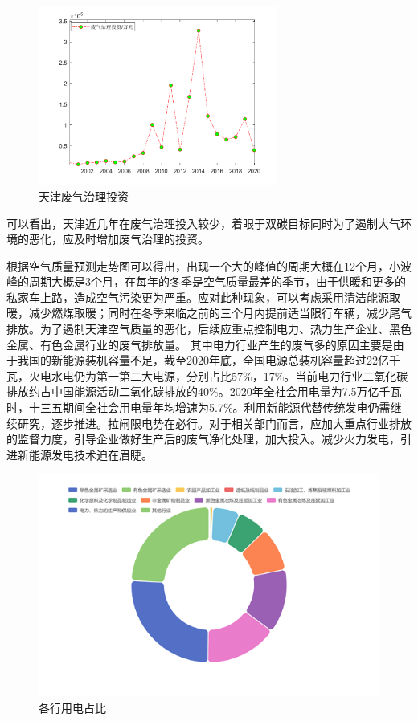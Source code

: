 \documentclass[UTF8]{ctexart}
\begin{document}
\begin{figure}[H] %
    \centering %
    \includegraphics[width=0.7\textwidth]{./picture/touzi.png} %
    \caption{天津废气治理投资} 
\end{figure}

可以看出，天津近几年在废气治理投入较少，着眼于双碳目标同时为了遏制大气环境的恶化，应及时增加废气治理的投资。

根据空气质量预测走势图可以得出，出现一个大的峰值的周期大概在12个月，小波峰的周期大概是3个月，在每年的冬季是空气质量最差的季节，由于供暖和更多的私家车上路，造成空气污染更为严重。应对此种现象，可以考虑采用清洁能源取暖，减少燃煤取暖；同时在冬季来临之前的三个月内提前适当限行车辆，减少尾气排放。为了遏制天津空气质量的恶化，后续应重点控制电力、热力生产企业、黑色金属、有色金属行业的废气排放量。
\newpage
其中电力行业产生的废气多的原因主要是由于我国的新能源装机容量不足，截至2020年底，全国电源总装机容量超过22亿千瓦，火电水电仍为第一第二大电源，分别占比57\%，17\%。当前电力行业二氧化碳排放约占中国能源活动二氧化碳排放的40\%。2020年全社会用电量为7.5万亿千瓦时，十三五期间全社会用电量年均增速为5.7\%。利用新能源代替传统发电仍需继续研究，逐步推进。拉闸限电势在必行。对于相关部门而言，应加大重点行业排放的监督力度，引导企业做好生产后的废气净化处理，加大投入。减少火力发电，引进新能源发电技术迫在眉睫。
\begin{figure}[H] %
    \centering %
    \includegraphics[width=1\textwidth]{./picture/quanquan.png} %
    \caption{各行用电占比} 
\end{figure}
\end{document}

